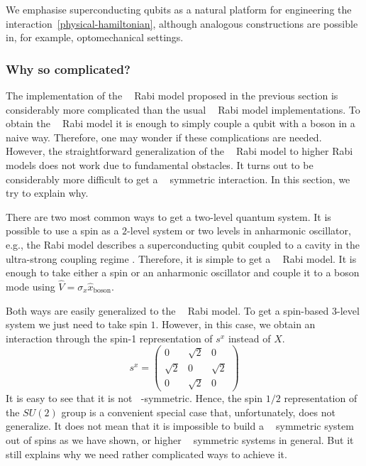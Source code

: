\documentclass[reprint, aps, prx, amsmath, amssymb, longbibliography, superscriptaddress]{revtex4-2}
\DeclareMathOperator{\Zn}{\mathbb{Z}_n}
\DeclareMathOperator{\Zthree}{\mathbb{Z}_3}
\DeclareMathOperator{\Ztwo}{\mathbb{Z}_2}
\begin{document}
We emphasise superconducting qubits as a natural platform for engineering the
interaction~\eqref{physical-hamiltonian}, although analogous constructions are
possible in, for example, optomechanical settings.


\subsubsection{Why so complicated?}

The implementation of the $\Zthree$ Rabi model proposed in the previous section is considerably more complicated than the usual $\Ztwo$ Rabi model implementations. To obtain the $\Ztwo$ Rabi model it is enough to simply couple a qubit with a boson in a naive way. Therefore, one may wonder if these complications are needed. However, the straightforward generalization of the $\Ztwo$ Rabi model to higher Rabi models does not work due to fundamental obstacles. It turns out to be considerably more difficult to get a $\Zthree$ symmetric interaction. In this section, we try to explain why.

There are two most common ways to get a two-level quantum system. It is possible to use a spin as a $2$-level system  \cite{bosco_fully_2022,felicetti_quantum_2017,skogvoll_tunable_2021} or two levels in anharmonic oscillator, e.g., the Rabi model describes a superconducting qubit coupled to a cavity in the ultra-strong coupling regime \cite{niemczyk_circuit_2010,forn-diaz_ultrastrong_2017,yoshihara_superconducting_2017,vlasiuk_cavityinduced_2023, kozin_quantum_2024,chen_singlephotondriven_2017,PhysRevA.106.023702}. Therefore, it is simple to get a $\Ztwo$ Rabi model. It is enough to take either a spin or an anharmonic oscillator and couple it to a boson mode using $\hat V = \sigma_x \hat x_{\text{boson}}$.

Both ways are easily generalized to the $\Zthree$ Rabi model. To get a spin-based 3-level system we just need to take spin $1$. However, in this case, we obtain an interaction through the spin-1 representation of $s^x$ instead of $X$.
\begin{equation}
    s^x= \begin{pmatrix} 0 & \sqrt{2} & 0 \\ \sqrt{2} & 0 & \sqrt{2} \\ 0 & \sqrt{2} & 0 \end{pmatrix}
\end{equation}
It is easy to see that it is not $\Zthree$-symmetric. Hence, the spin $1/2$ representation of the $SU(2)$ group is a convenient special case that, unfortunately, does not generalize. It does not mean that it is impossible to build a $\Zthree$ symmetric system out of spins as we have shown, or higher $\Zn$ symmetric systems \cite{hutter_parafermions_2015} in general. But it still explains why we need rather complicated ways to achieve it.
\end{document}
